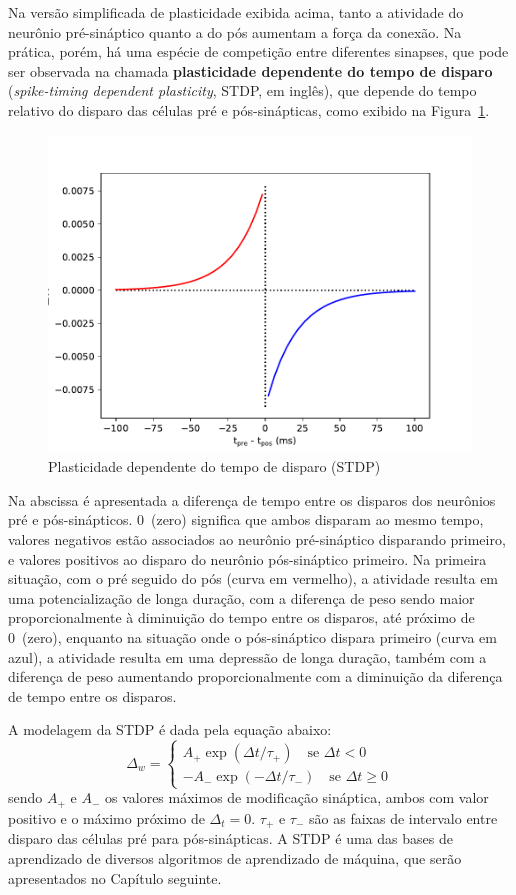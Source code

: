 Na versão simplificada de plasticidade exibida acima, tanto a atividade do neurônio pré-sináptico quanto a do pós aumentam a força da conexão. Na prática, porém, há uma espécie de competição entre diferentes sinapses, que pode ser observada na chamada \textbf{plasticidade dependente do tempo de disparo} (\textit{spike-timing dependent plasticity}, STDP, em inglês), que depende do tempo relativo do disparo das células pré e pós-sinápticas, como exibido na Figura~\ref{fig:stdp}.
\begin{figure}[tb]
	\centering
	\caption[Plasticidade dependente do tempo de disparo (STDP)]{Plasticidade dependente do tempo de disparo (STDP)}
	\label{fig:stdp}
	\includegraphics[width=0.7\linewidth]{figs/stdp}
\end{figure}
Na abscissa é apresentada a diferença de tempo entre os disparos dos neurônios pré e pós-sinápticos. 0~(zero) significa que ambos disparam ao mesmo tempo, valores negativos estão associados ao neurônio pré-sináptico disparando primeiro, e valores positivos ao disparo do neurônio pós-sináptico primeiro. Na primeira situação, com o pré seguido do pós (curva em vermelho), a atividade resulta em uma potencialização de longa duração, com a diferença de peso sendo maior proporcionalmente à diminuição do tempo entre os disparos, até próximo de 0~(zero), enquanto na situação onde o pós-sináptico dispara primeiro (curva em azul), a atividade resulta em uma depressão de longa duração, também com a diferença de peso aumentando proporcionalmente com a diminuição da diferença de tempo entre os disparos.

A modelagem da STDP é dada pela equação abaixo:
\begin{equation}\label{eq:stdp}
	\Delta_w=\begin{cases}
		A_+\exp(\Delta t/\tau_+)\quad\text{se }\Delta t<0\\
		-A_-\exp(-\Delta t/\tau_-)\quad\text{se }\Delta t\geq0
	\end{cases}
\end{equation}
sendo $A_+$ e $A_-$ os valores máximos de modificação sináptica, ambos com valor positivo e o máximo próximo de $\Delta_t=0$. $\tau_+$ e $\tau_-$ são as faixas de intervalo entre disparo das células pré para pós-sinápticas. A STDP é uma das bases de aprendizado de diversos algoritmos de aprendizado de máquina, que serão apresentados no Capítulo seguinte.

